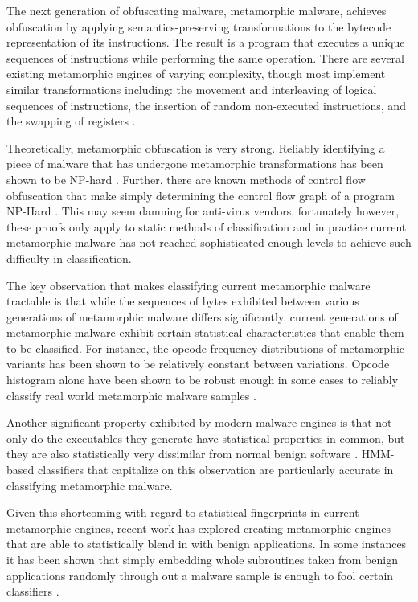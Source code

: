 \documentclass[finalcopy,short]{srpaper}
\begin{document}
  The next generation of obfuscating malware, metamorphic malware, achieves
  obfuscation by applying semantics-preserving transformations to the bytecode
  representation of its instructions. The result is a program that executes a
  unique sequences of instructions while performing the same operation. There
  are several existing metamorphic engines of varying complexity, though most
  implement similar transformations including: the movement and interleaving of
  logical sequences of instructions, the insertion of random non-executed
  instructions, and the swapping of registers \cite{simile}. 

  Theoretically, metamorphic obfuscation is very strong. Reliably identifying a
  piece of malware that has undergone metamorphic transformations has been shown
  to be NP-hard \cite{npcomplete}. Further, there are known methods of control
  flow obfuscation that make simply determining the control flow graph of a
  program NP-Hard \cite{controlflow}.  This may seem damning for anti-virus
  vendors, fortunately however, these proofs only apply to static methods of
  classification and in practice current metamorphic malware has not reached
  sophisticated enough levels to achieve such difficulty in classification.

  The key observation that makes classifying current metamorphic malware
  tractable is that while the sequences of bytes exhibited between various
  generations of metamorphic malware differs significantly, current generations
  of metamorphic malware exhibit certain statistical characteristics that enable
  them to be classified. For instance, the opcode frequency distributions of
  metamorphic variants has been shown to be relatively constant between
  variations. Opcode histogram alone have been shown to be robust enough in some
  cases to reliably classify real world metamorphic malware samples
  \cite{histogram}.

  Another significant property exhibited by modern malware engines is that not
  only do the executables they generate have statistical properties in common,
  but they are also statistically very dissimilar from normal benign software
  \cite{hmm_detect}. HMM-based classifiers that capitalize on this observation
  are particularly accurate in classifying metamorphic malware.

  Given this shortcoming with regard to statistical fingerprints in current
  metamorphic engines, recent work has explored creating metamorphic engines
  that are able to statistically blend in with benign applications.
  In some instances it has been shown that simply embedding whole subroutines
  taken from benign applications randomly through out a malware sample is enough
  to fool certain classifiers \cite{hmm_evade}.
\end{document}
